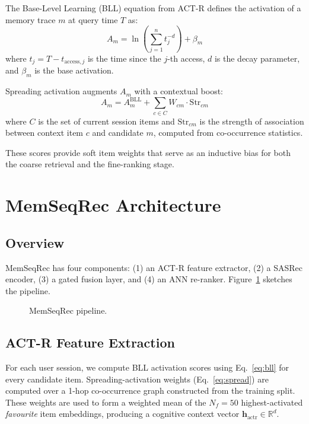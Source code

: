 \documentclass[conference]{IEEEtran}
\begin{document}
The Base-Level Learning (BLL) equation from ACT-R defines the
activation of a memory trace $m$ at query time $T$ as:
%
\begin{equation}
A_m = \ln\!\left( \sum_{j=1}^{n} t_j^{-d} \right) + \beta_m
\label{eq:bll}
\end{equation}
%
where $t_j = T - t_{\text{access},j}$ is the time since the $j$-th
access, $d$ is the decay parameter, and $\beta_m$ is the base
activation.

Spreading activation augments $A_m$ with a contextual boost:
%
\begin{equation}
A_m = A_m^{\text{BLL}} + \sum_{c \in C} W_{cm} \cdot \text{Str}_{cm}
\label{eq:spread}
\end{equation}
%
where $C$ is the set of current session items and $\text{Str}_{cm}$
is the strength of association between context item $c$ and
candidate $m$, computed from co-occurrence statistics.

These scores provide soft item weights that serve as an inductive
bias for both the coarse retrieval and the fine-ranking stage.

\section{MemSeqRec Architecture}

\subsection{Overview}
MemSeqRec has four components: (1) an ACT-R feature extractor,
(2) a SASRec encoder, (3) a gated fusion layer, and (4) an ANN
re-ranker.
Figure~\ref{fig:arch} sketches the pipeline.

\begin{figure}[t]
\centering
\caption{MemSeqRec pipeline.}
\label{fig:arch}
\end{figure}

\subsection{ACT-R Feature Extraction}
For each user session, we compute BLL activation scores using
Eq.~\eqref{eq:bll} for every candidate item.
Spreading-activation weights (Eq.~\eqref{eq:spread}) are computed
over a 1-hop co-occurrence graph constructed from the training
split.
These weights are used to form a weighted mean of the $N_f{=}50$
highest-activated \textit{favourite} item embeddings, producing
a cognitive context vector $\mathbf{h}_{\text{actr}} \in
\mathbb{R}^d$.
\end{document}
